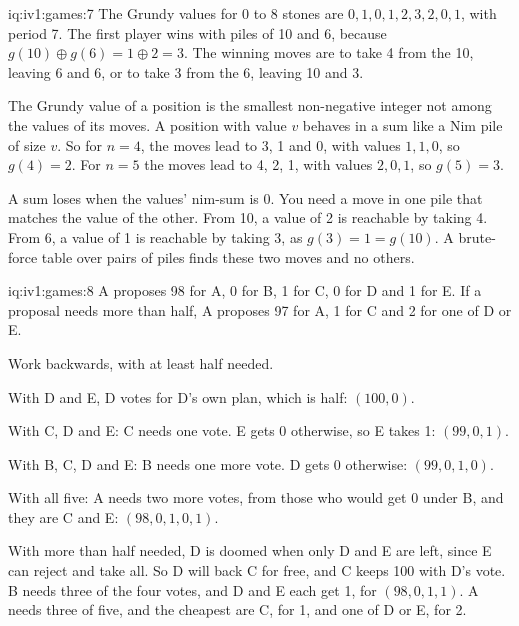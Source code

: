 \begin{solution}{iq:iv1:games:7}
The Grundy values for 0 to 8 stones are $0, 1, 0, 1, 2, 3, 2, 0, 1$, with period 7. The first player wins with piles of 10 and 6, because $g(10) \oplus g(6) = 1 \oplus 2 = 3$. The winning moves are to take 4 from the 10, leaving 6 and 6, or to take 3 from the 6, leaving 10 and 3.

The Grundy value of a position is the smallest non-negative integer not among the values of its moves. A position with value $v$ behaves in a sum like a Nim pile of size $v$. So for $n = 4$, the moves lead to 3, 1 and 0, with values $1, 1, 0$, so $g(4) = 2$. For $n = 5$ the moves lead to 4, 2, 1, with values $2, 0, 1$, so $g(5) = 3$.

A sum loses when the values' nim-sum is 0. You need a move in one pile that matches the value of the other. From 10, a value of 2 is reachable by taking 4. From 6, a value of 1 is reachable by taking 3, as $g(3) = 1 = g(10)$. A brute-force table over pairs of piles finds these two moves and no others.

\end{solution}

\begin{solution}{iq:iv1:games:8}
A proposes 98 for A, 0 for B, 1 for C, 0 for D and 1 for E. If a proposal needs more than half, A proposes 97 for A, 1 for C and 2 for one of D or E.

Work backwards, with at least half needed.

With D and E, D votes for D's own plan, which is half: $(100, 0)$.

With C, D and E: C needs one vote. E gets 0 otherwise, so E takes 1: $(99, 0, 1)$.

With B, C, D and E: B needs one more vote. D gets 0 otherwise: $(99, 0, 1, 0)$.

With all five: A needs two more votes, from those who would get 0 under B, and they are C and E: $(98, 0, 1, 0, 1)$.

With more than half needed, D is doomed when only D and E are left, since E can reject and take all. So D will back C for free, and C keeps 100 with D's vote. B needs three of the four votes, and D and E each get 1, for $(98, 0, 1, 1)$. A needs three of five, and the cheapest are C, for 1, and one of D or E, for 2.

\end{solution}

